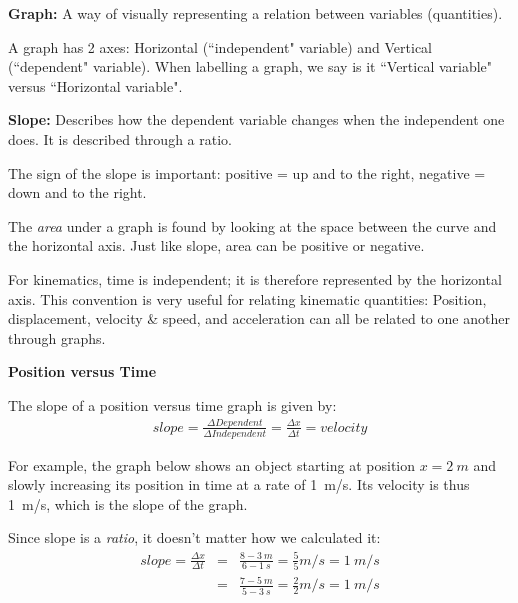 \documentclass[12pt]{article}
\begin{document}
\noindent \textbf{\large Graph:} A way of visually representing a relation between variables (quantities).

A graph has 2 axes: Horizontal (``independent" variable) and Vertical (``dependent" variable). When labelling a graph, we say is it ``Vertical variable" versus ``Horizontal variable".

\textbf{Slope:} Describes how the dependent variable changes when the independent one does. It is described through a ratio.
\begin{center}\end{center}

The sign of the slope is important: positive = up and to the right, negative = down and to the right.

The \textit{area} under a graph is found by looking at the space between the curve and the horizontal axis. Just like slope, area can be positive or negative.

\begin{center}\end{center}

For kinematics, time is independent; it is therefore represented by the horizontal axis. This convention is very useful for relating kinematic quantities: Position, displacement, velocity \& speed, and acceleration can all be related to one another through graphs.

\noindent\textbf{\large Position versus Time}

The slope of a position versus time graph is given by:
\begin{eqnarray}
slope = \frac{\Delta Dependent}{\Delta Independent} = \frac{\Delta x}{\Delta t} = velocity \nonumber
\end{eqnarray}

For example, the graph below shows an object starting at position $x=2~m$ and slowly increasing its position in time at a rate of 1~m/s. Its velocity is thus 1~m/s, which is the slope of the graph.

\begin{center}\end{center}

Since slope is a \textit{ratio}, it doesn't matter how we calculated it:
\begin{eqnarray}
slope = \frac{\Delta x}{\Delta t} &=& \frac{8-3~m}{6-1~s} = \frac{5}{5} m/s = 1~m/s\nonumber\\
&=& \frac{7-5~m}{5-3~s} = \frac{2}{2} m/s = 1~m/s\nonumber
\end{eqnarray}
\end{document}

